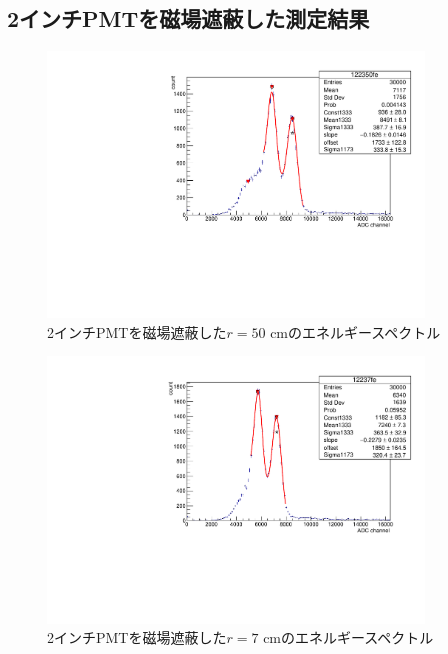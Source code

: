 \subsection{2インチPMTを磁場遮蔽した測定結果}

\begin{figure}[tbp]
	\centering
		\includegraphics[clip,angle=-90,width=10cm]{fig/iguchi/122350fe.pdf}
	\caption{2インチPMTを磁場遮蔽した$r=50$ cmのエネルギースペクトル}
	\label{hist50fe}
\end{figure}
\begin{figure}[tbp]
	\centering
		\includegraphics[clip,angle=-90,width=10cm]{fig/iguchi/12237fe.pdf}
	\caption{2インチPMTを磁場遮蔽した$r=7$ cmのエネルギースペクトル}
	\label{hist7fe}
\end{figure}

